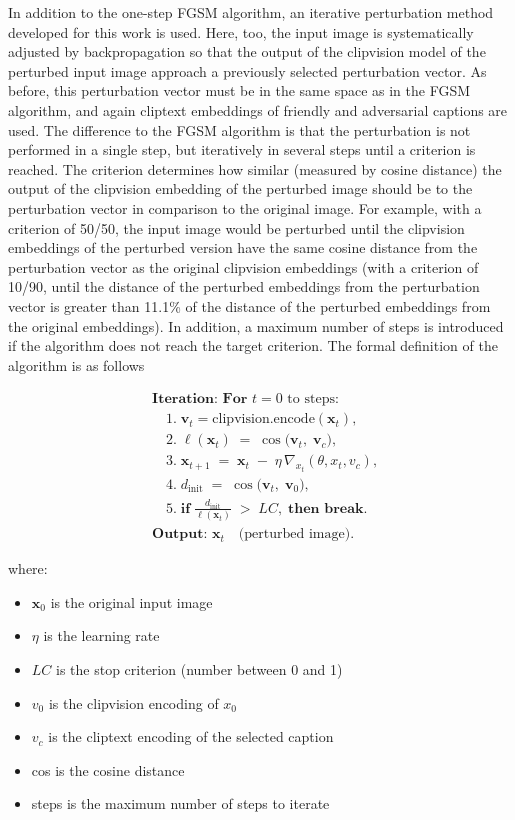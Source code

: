 In addition to the one-step FGSM algorithm, an iterative perturbation method developed for this work is used. Here, too, the input image is systematically adjusted by backpropagation so that the output of the clipvision model of the perturbed input image approach a previously selected perturbation vector. As before, this perturbation vector must be in the same space as in the FGSM algorithm, and again cliptext embeddings of friendly and adversarial captions are used. The difference to the FGSM algorithm is that the perturbation is not performed in a single step, but iteratively in several steps until a criterion is reached. The criterion determines how similar (measured by cosine distance) the output of the clipvision embedding of the perturbed image should be to the perturbation vector in comparison to the original image. For example, with a criterion of 50/50, the input image would be perturbed until the clipvision embeddings of the perturbed version have the same cosine distance from the perturbation vector as the original clipvision embeddings (with a criterion of 10/90, until the distance of the perturbed embeddings from the perturbation vector is greater than 11.1\% of the distance of the perturbed embeddings from the original embeddings). In addition, a maximum number of steps is introduced if the algorithm does not reach the target criterion. The formal definition of the algorithm is as follows 

\[
\begin{aligned}
& \textbf{Iteration: For } t = 0 \text{ to steps:}\\
& \quad 1.\; \mathbf{v}_t = \mathrm{clipvision.encode}(\mathbf{x}_t), \\[4pt]
& \quad 2.\; \ell(\mathbf{x}_t) 
\;=\; \cos\bigl(\mathbf{v}_t,\;\mathbf{v}_c\bigr), \\[4pt]
& \quad 3.\; \mathbf{x}_{t+1} 
\;=\; \mathbf{x}_t \;-\; \eta \,\nabla_{x_t} (\theta, x_t, v_c), \\[4pt]
& \quad 4.\; d_{\text{init}} 
\;=\; \cos\bigl(\mathbf{v}_t,\;\mathbf{v}_0\bigr), \\[4pt]
& \quad 5.\; \textbf{if} \;\frac{d_{\text{init}}}{\ell(\mathbf{x}_t)} 
\;>\; LC, \;\textbf{then break}.\\[6pt]
%
& \textbf{Output: } \mathbf{x}_t \quad \text{(perturbed image)}.
\end{aligned}
\]

where:
\begin{itemize}
    \item $\mathbf{x}_0$ is the original input image
    \item $\eta$ is the learning rate
    \item $LC$ is the stop criterion (number between 0 and 1)
    \item $v_0$ is the clipvision encoding of $x_0$
    \item $v_c$ is the cliptext encoding of the selected caption
    \item cos is the cosine distance
    \item steps is the maximum number of steps to iterate
\end{itemize}

